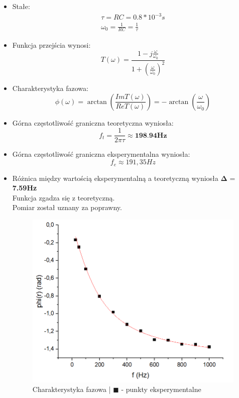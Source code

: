 \begin{itemize}
    \item Stałe:
        \begin{gather}
            \tau = RC = 0.8 * 10^{-3}s \\
            \omega_0 = \frac{1}{RC} = \frac{1}{\tau}
        \end{gather}
    \item Funkcja przejścia wynosi:
        \begin{equation}
            T(\omega) = \frac{1 - j \frac{\omega}{\omega_0}}{1 + (\frac{\omega}{\omega_0})^2}
        \end{equation}
    \item Charakterystyka fazowa:
        \begin{equation}
            \phi(\omega) = \arctan({\frac{Im T(\omega)}{Re T(\omega)}}) = -\arctan({\frac{\omega}{\omega_0}})
        \end{equation}
    \item Górna częstotliwość graniczna teoretyczna wyniosła: 
        \begin{equation}
            f_t = \frac{1}{2 \pi \tau} \approx \textbf{198.94Hz}
        \end{equation}
    \item Górna częstotliwość graniczna eksperymentalna wyniosła:
        \begin{equation}
            f_e \approx 191,35Hz
        \end{equation}
    \item Różnica między wartością eksperymentalną a teoretyczną wyniosła $\boldsymbol{\Delta}$ = \textbf{7.59Hz}\\
        Funkcja zgadza się z teoretyczną. \\
        Pomiar został uznany za poprawny.
    \begin{figure}[H]
        \centering
        \includegraphics[scale=0.55]{img_wykresy/fazowa_RC.png}
        \caption{Charakterystyka fazowa | $\blacksquare$ - punkty eksperymentalne}
        \label{fig:CR_amp}
    \end{figure}
\end{itemize}


